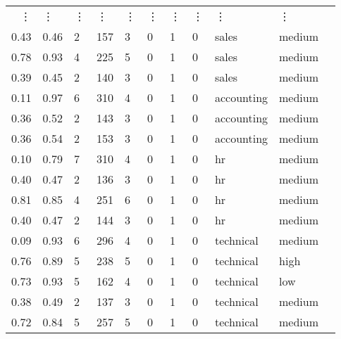 \documentclass[11pt]{article}
\begin{document}
\begin{tabular}{r|llllllllll}
	 ⋮ & ⋮ & ⋮ & ⋮ & ⋮ & ⋮ & ⋮ & ⋮ & ⋮ & ⋮\\
	 0.43       & 0.46       & 2          & 157        & 3          & 0          & 1          & 0          & sales      & medium    \\
	 0.78       & 0.93       & 4          & 225        & 5          & 0          & 1          & 0          & sales      & medium    \\
	 0.39       & 0.45       & 2          & 140        & 3          & 0          & 1          & 0          & sales      & medium    \\
	 0.11       & 0.97       & 6          & 310        & 4          & 0          & 1          & 0          & accounting & medium    \\
	 0.36       & 0.52       & 2          & 143        & 3          & 0          & 1          & 0          & accounting & medium    \\
	 0.36       & 0.54       & 2          & 153        & 3          & 0          & 1          & 0          & accounting & medium    \\
	 0.10       & 0.79       & 7          & 310        & 4          & 0          & 1          & 0          & hr         & medium    \\
	 0.40       & 0.47       & 2          & 136        & 3          & 0          & 1          & 0          & hr         & medium    \\
	 0.81       & 0.85       & 4          & 251        & 6          & 0          & 1          & 0          & hr         & medium    \\
	 0.40       & 0.47       & 2          & 144        & 3          & 0          & 1          & 0          & hr         & medium    \\
	 0.09       & 0.93       & 6          & 296        & 4          & 0          & 1          & 0          & technical  & medium    \\
	 0.76       & 0.89       & 5          & 238        & 5          & 0          & 1          & 0          & technical  & high      \\
	 0.73       & 0.93       & 5          & 162        & 4          & 0          & 1          & 0          & technical  & low       \\
	 0.38       & 0.49       & 2          & 137        & 3          & 0          & 1          & 0          & technical  & medium    \\
	 0.72       & 0.84       & 5          & 257        & 5          & 0          & 1          & 0          & technical  & medium    \\

\end{tabular}
\end{document}
